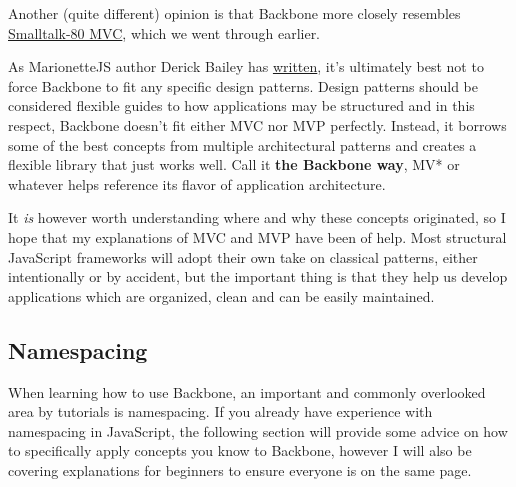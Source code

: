 \documentclass[9pt]{book}
\newenvironment{Shaded}{}{}
\newcommand{\KeywordTok}[1]{\textcolor[rgb]{0.00,0.44,0.13}{\textbf{{#1}}}}
\newcommand{\DataTypeTok}[1]{\textcolor[rgb]{0.56,0.13,0.00}{{#1}}}
\newcommand{\CommentTok}[1]{\textcolor[rgb]{0.38,0.63,0.69}{\textit{{#1}}}}
\newcommand{\OtherTok}[1]{\textcolor[rgb]{0.00,0.44,0.13}{{#1}}}
\newcommand{\FunctionTok}[1]{\textcolor[rgb]{0.02,0.16,0.49}{{#1}}}
\newcommand{\NormalTok}[1]{{#1}}
\begin{document}
\begin{Shaded}
\end{Shaded}

Another (quite different) opinion is that Backbone more closely
resembles
\href{http://martinfowler.com/eaaDev/uiArchs.html\#ModelViewController}{Smalltalk-80
MVC}, which we went through earlier.

As MarionetteJS author Derick Bailey has
\href{http://lostechies.com/derickbailey/2011/12/23/backbone-js-is-not-an-mvc-framework/}{written},
it's ultimately best not to force Backbone to fit any specific design
patterns. Design patterns should be considered flexible guides to how
applications may be structured and in this respect, Backbone doesn't fit
either MVC nor MVP perfectly. Instead, it borrows some of the best
concepts from multiple architectural patterns and creates a flexible
library that just works well. Call it \textbf{the Backbone way}, MV* or
whatever helps reference its flavor of application architecture.

It \emph{is} however worth understanding where and why these concepts
originated, so I hope that my explanations of MVC and MVP have been of
help. Most structural JavaScript frameworks will adopt their own take on
classical patterns, either intentionally or by accident, but the
important thing is that they help us develop applications which are
organized, clean and can be easily maintained.

\subsection{Namespacing}\label{namespacing}

When learning how to use Backbone, an important and commonly overlooked
area by tutorials is namespacing. If you already have experience with
namespacing in JavaScript, the following section will provide some
advice on how to specifically apply concepts you know to Backbone,
however I will also be covering explanations for beginners to ensure
everyone is on the same page.
\end{document}
